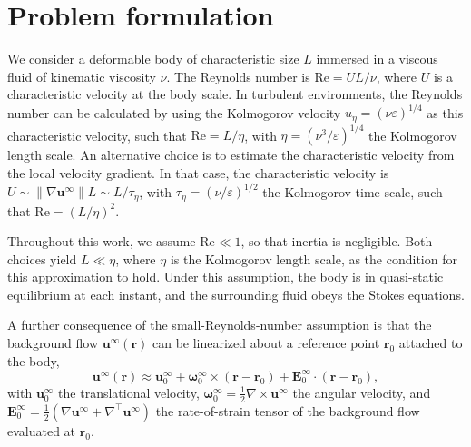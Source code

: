 \documentclass[aps,prfluids,groupedaddress]{revtex4-2}
\newcommand{\Reyn}{\mathrm{Re}}
\newcommand{\br}{\bm{r}}
\newcommand{\bu}{\bm{u}}
\newcommand{\bomega}{\bm{\omega}}
\newcommand{\tE}{\bm{{E}}}
\begin{document}
\section{Problem formulation\label{sec.theory}}


We consider a deformable body of characteristic size $L$ immersed in a viscous fluid of kinematic viscosity $\nu$. 
The Reynolds number is $\Reyn = UL/\nu$, where $U$ is a characteristic velocity at the body scale. 
In turbulent environments, the Reynolds number can be calculated by using the Kolmogorov velocity $u_\eta=(\nu\varepsilon)^{1/4}$ as this characteristic velocity, such that $\Reyn = L/\eta$, with $\eta=(\nu^3/\varepsilon)^{1/4}$ the Kolmogorov length scale. An alternative choice is to estimate the characteristic velocity from the local velocity gradient. In that case, the characteristic velocity is $U \sim \|\nabla\bu^\infty\|L \sim L /\tau_\eta$, with $\tau_\eta = (\nu / \varepsilon)^{1/2}$ the Kolmogorov time scale, such that $\Reyn = (L/\eta)^2$. 

Throughout this work, we assume $\Reyn \ll 1$, so that inertia is negligible. 
Both choices yield $L\ll\eta$, where $\eta$ is the Kolmogorov length scale, as the condition for this approximation to hold. Under this assumption, the body is in quasi-static equilibrium at each instant, and the surrounding fluid obeys the Stokes equations.

A further consequence of the small-Reynolds-number assumption is that the background flow $\bu^\infty(\br)$ can be linearized about a reference point $\br_0$ attached to the body,
\begin{equation}\label{eq:bg_flow}
\bu^\infty(\br) \approx \bu_0^\infty + \bomega_0^\infty \times (\br-\br_0)  + \tE_0^\infty \cdot (\br-\br_0),
\end{equation}
with $\bu_0^\infty$ the translational velocity, $\bomega_0^\infty = \frac{1}{2}\nabla\times\bu^\infty$ the angular velocity, and $\tE_0^\infty = \frac{1}{2}(\nabla\bu^\infty + \nabla^\top\bu^\infty)$ the rate-of-strain tensor of the background flow evaluated at $\br_0$.
\end{document}
